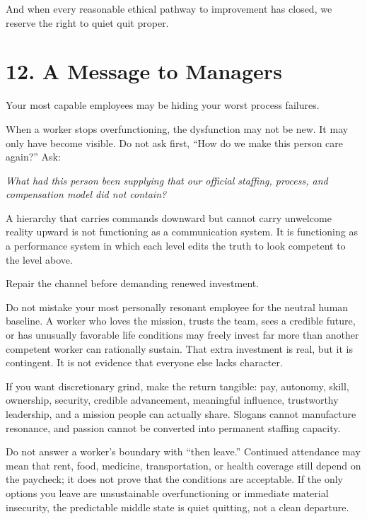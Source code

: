 \documentclass[11pt,oneside]{article}
\renewenvironment{quote}
  {\begin{tcolorbox}[
      enhanced,
      breakable,
      colback=ManifestLight,
      colframe=ManifestRule,
      boxrule=0pt,
      leftrule=3pt,
      arc=0pt,
      outer arc=0pt,
      left=10pt,right=10pt,top=8pt,bottom=8pt,
      before skip=0.8em,after skip=0.8em
    ]\itshape}
  {\end{tcolorbox}}
\begin{document}
And when every reasonable ethical pathway to improvement has closed, we
reserve the right to quiet quit proper.

\section{12. A Message to Managers}\label{a-message-to-managers}

Your most capable employees may be hiding your worst process failures.

When a worker stops overfunctioning, the dysfunction may not be new. It
may only have become visible. Do not ask first, ``How do we make this
person care again?'' Ask:

\begin{quote}
What had this person been supplying that our official staffing, process,
and compensation model did not contain?
\end{quote}

A hierarchy that carries commands downward but cannot carry unwelcome
reality upward is not functioning as a communication system. It is
functioning as a performance system in which each level edits the truth
to look competent to the level above.

Repair the channel before demanding renewed investment.

Do not mistake your most personally resonant employee for the neutral
human baseline. A worker who loves the mission, trusts the team, sees a
credible future, or has unusually favorable life conditions may freely
invest far more than another competent worker can rationally sustain.
That extra investment is real, but it is contingent. It is not evidence
that everyone else lacks character.

If you want discretionary grind, make the return tangible: pay,
autonomy, skill, ownership, security, credible advancement, meaningful
influence, trustworthy leadership, and a mission people can actually
share. Slogans cannot manufacture resonance, and passion cannot be
converted into permanent staffing capacity.

Do not answer a worker's boundary with ``then leave.'' Continued
attendance may mean that rent, food, medicine, transportation, or health
coverage still depend on the paycheck; it does not prove that the
conditions are acceptable. If the only options you leave are
unsustainable overfunctioning or immediate material insecurity, the
predictable middle state is quiet quitting, not a clean departure.
\end{document}
